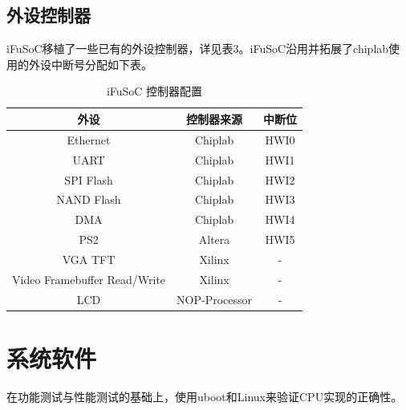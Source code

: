 \documentclass{article}
\begin{document}
\subsection{外设控制器}
iFuSoC移植了一些已有的外设控制器，详见表3。iFuSoC沿用并拓展了chiplab使用的外设中断号分配如下表。\par
\begin{table}[h]
    \begin{center}
        \begin{tabular}{|c|c|c|}
            \hline
            外设 & 控制器来源 & 中断位 \\
            \hline
            Ethernet    & Chiplab                 & HWI0 \\
            UART        & Chiplab                 & HWI1 \\
            SPI Flash   & Chiplab                 & HWI2 \\
            NAND Flash  & Chiplab                 & HWI3 \\
            DMA         & Chiplab                 & HWI4 \\
            PS2         & Altera                  & HWI5 \\
            VGA TFT     &  Xilinx                 & -    \\
            Video Framebuffer Read/Write &  Xilinx  &  - \\
            LCD         & NOP-Processor           & -    \\
            \hline
        \end{tabular}
        \caption{iFuSoC 控制器配置}
    \end{center}
\end{table}

\section{系统软件}
在功能测试与性能测试的基础上，使用uboot和Linux来验证CPU实现的正确性。
\end{document}
